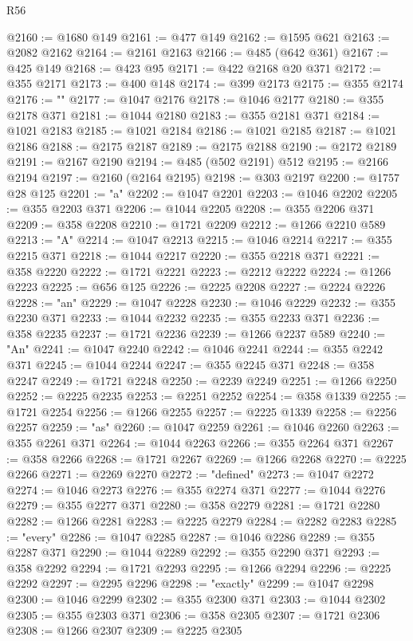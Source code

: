 \begin{lexlean}{R56}
\begin{coremodule}
@2160 := @1680 @149
@2161 := @477 @149
@2162 := @1595 @621
@2163 := @2082 @2162
@2164 := @2161 @2163
@2166 := @485 (@642 @361)
@2167 := @425 @149
@2168 := @423 @95
@2171 := @422 @2168 @20 @371
@2172 := @355 @2171
@2173 := @400 @148
@2174 := @399 @2173
@2175 := @355 @2174
@2176 := ""
@2177 := @1047 @2176
@2178 := @1046 @2177
@2180 := @355 @2178 @371
@2181 := @1044 @2180
@2183 := @355 @2181 @371
@2184 := @1021 @2183
@2185 := @1021 @2184
@2186 := @1021 @2185
@2187 := @1021 @2186
@2188 := @2175 @2187
@2189 := @2175 @2188
@2190 := @2172 @2189
@2191 := @2167 @2190
@2194 := @485 (@502 @2191) @512
@2195 := @2166 @2194
@2197 := @2160 (@2164 @2195)
@2198 := @303 @2197
@2200 := @1757 @28 @125
@2201 := "a"
@2202 := @1047 @2201
@2203 := @1046 @2202
@2205 := @355 @2203 @371
@2206 := @1044 @2205
@2208 := @355 @2206 @371
@2209 := @358 @2208
@2210 := @1721 @2209
@2212 := @1266 @2210 @589
@2213 := "A"
@2214 := @1047 @2213
@2215 := @1046 @2214
@2217 := @355 @2215 @371
@2218 := @1044 @2217
@2220 := @355 @2218 @371
@2221 := @358 @2220
@2222 := @1721 @2221
@2223 := @2212 @2222
@2224 := @1266 @2223
@2225 := @656 @125
@2226 := @2225 @2208
@2227 := @2224 @2226
@2228 := "an"
@2229 := @1047 @2228
@2230 := @1046 @2229
@2232 := @355 @2230 @371
@2233 := @1044 @2232
@2235 := @355 @2233 @371
@2236 := @358 @2235
@2237 := @1721 @2236
@2239 := @1266 @2237 @589
@2240 := "An"
@2241 := @1047 @2240
@2242 := @1046 @2241
@2244 := @355 @2242 @371
@2245 := @1044 @2244
@2247 := @355 @2245 @371
@2248 := @358 @2247
@2249 := @1721 @2248
@2250 := @2239 @2249
@2251 := @1266 @2250
@2252 := @2225 @2235
@2253 := @2251 @2252
@2254 := @358 @1339
@2255 := @1721 @2254
@2256 := @1266 @2255
@2257 := @2225 @1339
@2258 := @2256 @2257
@2259 := "as"
@2260 := @1047 @2259
@2261 := @1046 @2260
@2263 := @355 @2261 @371
@2264 := @1044 @2263
@2266 := @355 @2264 @371
@2267 := @358 @2266
@2268 := @1721 @2267
@2269 := @1266 @2268
@2270 := @2225 @2266
@2271 := @2269 @2270
@2272 := "defined"
@2273 := @1047 @2272
@2274 := @1046 @2273
@2276 := @355 @2274 @371
@2277 := @1044 @2276
@2279 := @355 @2277 @371
@2280 := @358 @2279
@2281 := @1721 @2280
@2282 := @1266 @2281
@2283 := @2225 @2279
@2284 := @2282 @2283
@2285 := "every"
@2286 := @1047 @2285
@2287 := @1046 @2286
@2289 := @355 @2287 @371
@2290 := @1044 @2289
@2292 := @355 @2290 @371
@2293 := @358 @2292
@2294 := @1721 @2293
@2295 := @1266 @2294
@2296 := @2225 @2292
@2297 := @2295 @2296
@2298 := "exactly"
@2299 := @1047 @2298
@2300 := @1046 @2299
@2302 := @355 @2300 @371
@2303 := @1044 @2302
@2305 := @355 @2303 @371
@2306 := @358 @2305
@2307 := @1721 @2306
@2308 := @1266 @2307
@2309 := @2225 @2305

\end{coremodule}
\end{lexlean}
